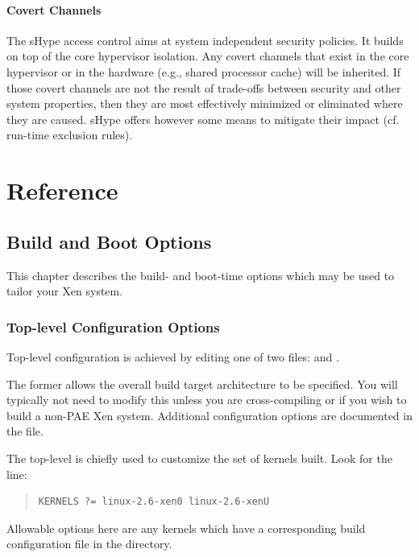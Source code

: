 \documentclass[11pt,twoside,final,openright]{report}
\begin{document}
\subsection{Covert Channels}

The sHype access control aims at system independent security policies.
It builds on top of the core hypervisor isolation. Any covert channels
that exist in the core hypervisor or in the hardware (e.g., shared
processor cache) will be inherited. If those covert channels are not
the result of trade-offs between security and other system properties,
then they are most effectively minimized or eliminated where they are
caused. sHype offers however some means to mitigate their impact
(cf. run-time exclusion rules).

\part{Reference}

\chapter{Build and Boot Options} 

This chapter describes the build- and boot-time options which may be
used to tailor your Xen system.

\section{Top-level Configuration Options} 

Top-level configuration is achieved by editing one of two 
files:  and . 

The former allows the overall build target architecture to be 
specified. You will typically not need to modify this unless 
you are cross-compiling or if you wish to build a non-PAE  
Xen system. Additional configuration options are documented 
in the  file. 

The top-level  is chiefly used to customize the set of
kernels built. Look for the line: 
\begin{quote}
\begin{verbatim}
KERNELS ?= linux-2.6-xen0 linux-2.6-xenU
\end{verbatim}
\end{quote}

Allowable options here are any kernels which have a corresponding 
build configuration file in the  directory. 
\end{document}
